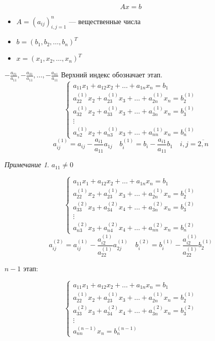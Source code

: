 \documentclass[english]{article}
\theoremstyle{plain}
\theoremstyle{remark}
\newtheorem*{remark}{Примечание}
\theoremstyle{definition}
\begin{document}
\[ Ax = b \]
\begin{itemize}
\item \(A = (a_{ij})_{i,j = 1}^n\) --- вещественные числа
\item \(b = (b_1, b_2, \dots, b_n)^T\)
\item \(x = (x_1, x_2, \dots, x_n)^T\)
\end{itemize}
\(-\frac{a_{21}}{a_{11}}, -\frac{a_{31}}{a_{11}}, \dots, -\frac{a_{n1}}{a_{11}}\)
Верхний индекс обозначает этап.
\[ \begin{cases}
a_{11}x_1 + a_{12} x_2 + \dots + a_{1n}x_n = b_1 \\
a_{22}^{(1)}x_2 + a_{23}^{(1)}x_3 + \dots + a_{2n}^{(1)}x_n = b_2^{(1)} \\
a_{32}^{(1)}x_2 + a_{33}^{(1)}x_3 + \dots + a_{3n}^{(1)}x_n = b_3^{(1)} \\
\vdots \\
a_{n2}^{(1)}x_2 + a_{n3}^{(1)}x_3 + \dots + a_{nn}^{(1)}x_n = b_n^{(1)}
\end{cases} \]
\[ a_{ij}^{(1)} = a_{ij} - \frac{a_{i1}}{a_{11}}a_{1j} \quad b_i^{(1)} = b_i - \frac{a_{i1}}{a_{11}}b_1 \quad i,j = \overline{2, n}\]
\begin{remark}
\(a_{11} \neq 0\)
\end{remark}

\[ \begin{cases}
a_{11}x_1 + a_{12} x_2 + \dots + a_{1n}x_n = b_1 \\
a_{22}^{(1)}x_2 + a_{23}^{(1)}x_3 + \dots + a_{2n}^{(1)}x_n = b_2^{(1)} \\
a_{33}^{(2)}x_3 + a_{34}^{(2)}x_4 + \dots + a_{3n}^{(2)}x_n = b_3^{(2)} \\
\vdots \\
a_{n3}^{(2)}x_3 + a_{n4}^{(2)}x_4 + \dots + a_{nn}^{(2)}x_n = b_n^{(2)}
\end{cases} \]
\[ a_{ij}^{(2)} = a_{ij}^{(1)} - \frac{a_{i2}^{(1)}}{a_{22}^{(1)}}a_{2j}^{(1)} \quad b_i^{(2)} = b_i^{(1)} - \frac{a_{i2}^{(1)}}{a_{22}^{(1)}}b_2^{(1)} \]

\(n - 1\) этап:

\[ \begin{cases}
a_{11}x_1 + a_{12} x_2 + \dots + a_{1n}x_n = b_1 \\
a_{22}^{(1)}x_2 + a_{23}^{(1)}x_3 + \dots + a_{2n}^{(1)}x_n = b_2^{(1)} \\
a_{33}^{(2)}x_3 + a_{34}^{(2)}x_4 + \dots + a_{3n}^{(2)}x_n = b_3^{(2)} \\
\vdots \\
a_{nn}^{(n - 1)}x_n = b_n^{(n - 1)}
\end{cases} \]
\end{document}
